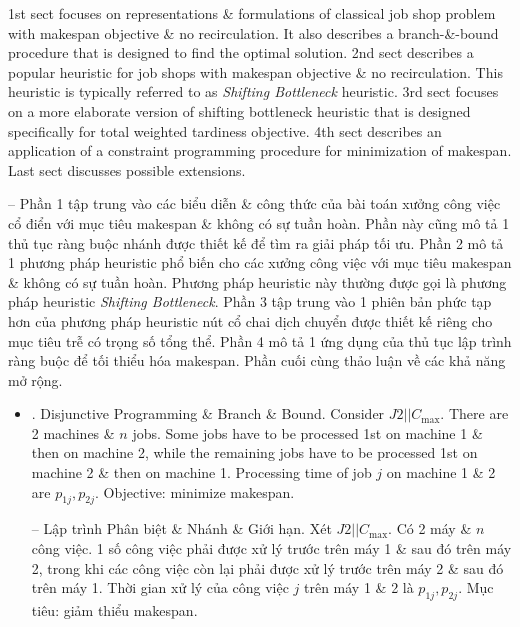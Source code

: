 \documentclass{article}
\begin{document}
\begin{itemize}
    1st sect focuses on representations \& formulations of classical job shop problem with makespan objective \& no recirculation. It also describes a branch-\&-bound procedure that is designed to find the optimal solution. 2nd sect describes a popular heuristic for job shops with makespan objective \& no recirculation. This heuristic is typically referred to as {\it Shifting Bottleneck} heuristic. 3rd sect focuses on a more elaborate version of shifting bottleneck heuristic that is designed specifically for total weighted tardiness objective. 4th sect describes an application of a constraint programming procedure for minimization of makespan. Last sect discusses possible extensions.

    -- Phần 1 tập trung vào các biểu diễn \& công thức của bài toán xưởng công việc cổ điển với mục tiêu makespan \& không có sự tuần hoàn. Phần này cũng mô tả 1 thủ tục ràng buộc nhánh được thiết kế để tìm ra giải pháp tối ưu. Phần 2 mô tả 1 phương pháp heuristic phổ biến cho các xưởng công việc với mục tiêu makespan \& không có sự tuần hoàn. Phương pháp heuristic này thường được gọi là phương pháp heuristic {\it Shifting Bottleneck}. Phần 3 tập trung vào 1 phiên bản phức tạp hơn của phương pháp heuristic nút cổ chai dịch chuyển được thiết kế riêng cho mục tiêu trễ có trọng số tổng thể. Phần 4 mô tả 1 ứng dụng của thủ tục lập trình ràng buộc để tối thiểu hóa makespan. Phần cuối cùng thảo luận về các khả năng mở rộng.
    \begin{itemize}
        \item {. Disjunctive Programming \& Branch \& Bound.} Consider $J2|| C_{\max}$. There are 2 machines \& $n$ jobs. Some jobs have to be processed 1st on machine 1 \& then on machine 2, while the remaining jobs have to be processed 1st on machine 2 \& then on machine 1. Processing time of job $j$ on machine 1 \& 2 are $p_{1j},p_{2j}$. Objective: minimize makespan.

        -- {\sf Lập trình Phân biệt \& Nhánh \& Giới hạn.} Xét $J2|| C_{\max}$. Có 2 máy \& $n$ công việc. 1 số công việc phải được xử lý trước trên máy 1 \& sau đó trên máy 2, trong khi các công việc còn lại phải được xử lý trước trên máy 2 \& sau đó trên máy 1. Thời gian xử lý của công việc $j$ trên máy 1 \& 2 là $p_{1j},p_{2j}$. Mục tiêu: giảm thiểu makespan.


\end{itemize}
\end{itemize}
\end{document}
